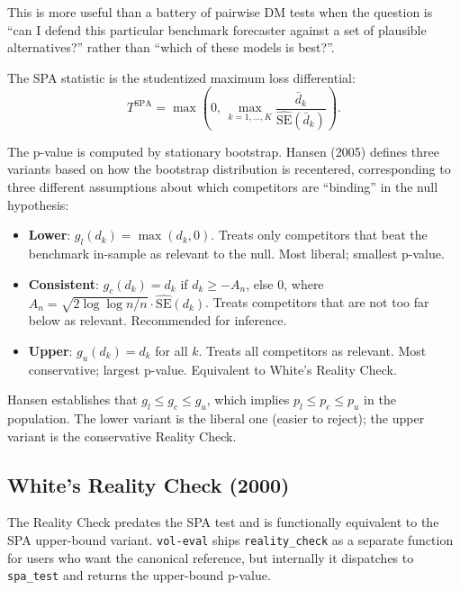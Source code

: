 This is more useful than a battery of pairwise DM tests when the question is ``can I defend this particular benchmark forecaster against a set of plausible alternatives?'' rather than ``which of these models is best?''.

The SPA statistic is the studentized maximum loss differential:
\begin{equation}
    T^{\text{SPA}} = \max\left(0, \, \max_{k=1,\ldots,K} \frac{\bar d_k}{\widehat{\text{SE}}(\bar d_k)}\right).
\end{equation}

The p-value is computed by stationary bootstrap. Hansen (2005) defines three variants based on how the bootstrap distribution is recentered, corresponding to three different assumptions about which competitors are ``binding'' in the null hypothesis:

\begin{itemize}[leftmargin=*]
    \item \textbf{Lower}: $g_l(d_k) = \max(d_k, 0)$. Treats only competitors that beat the benchmark in-sample as relevant to the null. Most liberal; smallest p-value.
    \item \textbf{Consistent}: $g_c(d_k) = d_k$ if $d_k \ge -A_n$, else $0$, where $A_n = \sqrt{2 \log\log n / n} \cdot \widehat{\text{SE}}(d_k)$. Treats competitors that are not too far below as relevant. Recommended for inference.
    \item \textbf{Upper}: $g_u(d_k) = d_k$ for all $k$. Treats all competitors as relevant. Most conservative; largest p-value. Equivalent to White's Reality Check.
\end{itemize}

Hansen \citeyearpar[p.371]{Hansen2005} establishes that $g_l \le g_c \le g_u$, which implies $p_l \le p_c \le p_u$ in the population. The lower variant is the liberal one (easier to reject); the upper variant is the conservative Reality Check.

\subsection{White's Reality Check (2000)}

The Reality Check predates the SPA test and is functionally equivalent to the SPA upper-bound variant. \texttt{vol-eval} ships \texttt{reality\_check} as a separate function for users who want the canonical reference, but internally it dispatches to \texttt{spa\_test} and returns the upper-bound p-value.

